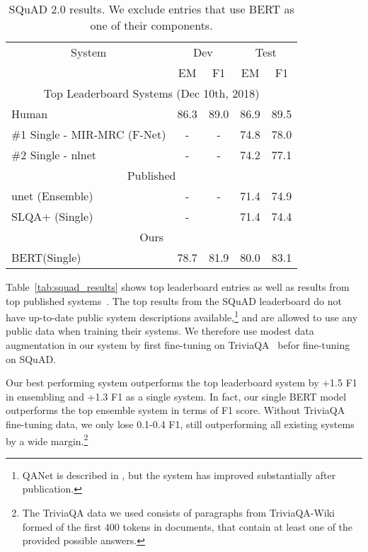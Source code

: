 \documentclass[11pt,a4paper]{article}
\newcommand\bertlarge{BERT\xspace}
\begin{document}
\begin{table}[t]
\begin{center}
{\small
\begin{tabular}{@{}lcccc@{}}
  \toprule
  \multicolumn{1}{c}{System} & \multicolumn{2}{c}{Dev} & \multicolumn{2}{c}{Test} \\
  & EM & F1 & EM & F1 \\
  \midrule

\multicolumn{5}{c}{Top Leaderboard Systems (Dec 10th, 2018)} \\
  Human                & 86.3 & 89.0 & 86.9& 89.5 \\ 
  \#1 Single - MIR-MRC (F-Net)   & - & - & 74.8 & 78.0 \\ 
  \#2 Single - nlnet   & - & - & 74.2 & 77.1 \\ 
  \midrule
  \multicolumn{5}{c}{Published}     \\
 unet (Ensemble) & - & -  & 71.4  & 74.9 \\ 
 SLQA+ (Single) & - & & 71.4 & 74.4\\
  \midrule
  \multicolumn{5}{c}{Ours} \\
  \bertlarge (Single)    & 78.7 & 81.9 & 80.0   &  83.1
 \\ 

\bottomrule
\end{tabular}
} \end{center}
\caption{\label{tab:squad2_results} SQuAD 2.0 results. We exclude entries that use BERT as one of their components.}
\end{table}
 

Table~\ref{tab:squad_results} shows top leaderboard entries as well as results from top published systems~\cite{bidaf,clark-gardner:2018:_simpl,peters-etal:2018:_deep,hu2017reinforced}.
The top results from the SQuAD leaderboard do not have up-to-date public system descriptions available,\footnote{QANet is described in , but the system has improved substantially after publication.} and are allowed to use any public data when training their systems. We therefore use modest data augmentation in our system by first fine-tuning on TriviaQA~\cite{joshi-etal:2017:_triviaq} befor fine-tuning on SQuAD.

Our best performing system outperforms the top leaderboard system by +1.5 F1 in ensembling and +1.3 F1 as a single system. In fact, our single BERT model outperforms the top ensemble system in terms of F1 score. Without TriviaQA fine-tuning data, we only lose 0.1-0.4 F1, still outperforming all existing systems by a wide margin.\footnote{The TriviaQA data we used consists of paragraphs from TriviaQA-Wiki formed of the first 400 tokens in documents, that contain at least one of the provided possible answers.}
\end{document}
